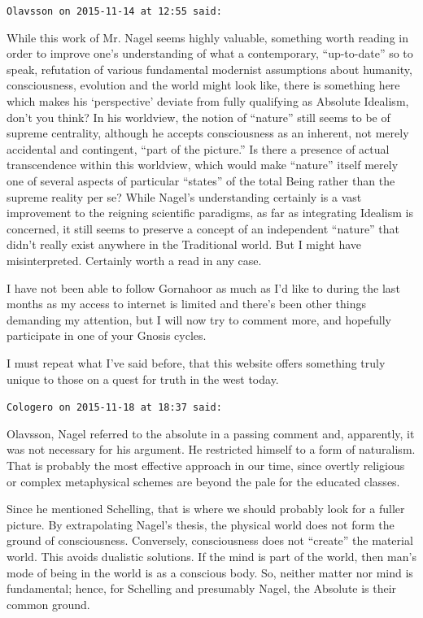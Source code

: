\begin{footnotesize}
\begin{sffamily}
\texttt{Olavsson on 2015-11-14 at 12:55 said: }

While this work of Mr. Nagel seems highly valuable, something worth reading in order to improve one's
understanding of what a contemporary, “up-to-date” so to speak, refutation of various fundamental modernist assumptions
about humanity, consciousness, evolution and the world might look like, there is something here which makes his
`perspective' deviate from fully qualifying as Absolute Idealism, don't you think?
In his worldview, the notion of “nature” still seems to be of supreme centrality, although he accepts consciousness as
an inherent, not merely accidental and contingent, “part of the picture.” Is there a presence of actual transcendence
within this worldview, which would make “nature” itself merely one of several aspects of particular “states” of the
total Being rather than the supreme reality per se? While Nagel's understanding certainly is a vast
improvement to the reigning scientific paradigms, as far as integrating Idealism is concerned, it still seems to
preserve a concept of an independent “nature” that didn't really exist anywhere in the Traditional world.
But I might have misinterpreted. Certainly worth a read in any case.

I have not been able to follow Gornahoor as much as I'd like to during the last months as my access to
internet is limited and there's been other things demanding my attention, but I will now try to comment
more, and hopefully participate in one of your Gnosis cycles.

I must repeat what I've said before, that this website offers something truly unique to those on a quest for
truth in the west today.


\hfill

\texttt{Cologero on 2015-11-18 at 18:37 said: }

Olavsson, Nagel referred to the absolute in a passing comment and, apparently, it was not necessary for his argument. He
restricted himself to a form of naturalism. That is probably the most effective approach in our time, since overtly
religious or complex metaphysical schemes are beyond the pale for the educated classes.

Since he mentioned Schelling, that is where we should probably look for a fuller picture. By extrapolating
Nagel's thesis, the physical world does not form the ground of consciousness. Conversely, consciousness
does not “create” the material world. This avoids dualistic solutions. If the mind is part of the world, then
man's mode of being in the world is as a conscious body. So, neither matter nor mind is fundamental; hence,
for Schelling and presumably Nagel, the Absolute is their common ground.


\end{sffamily}
\end{footnotesize}
